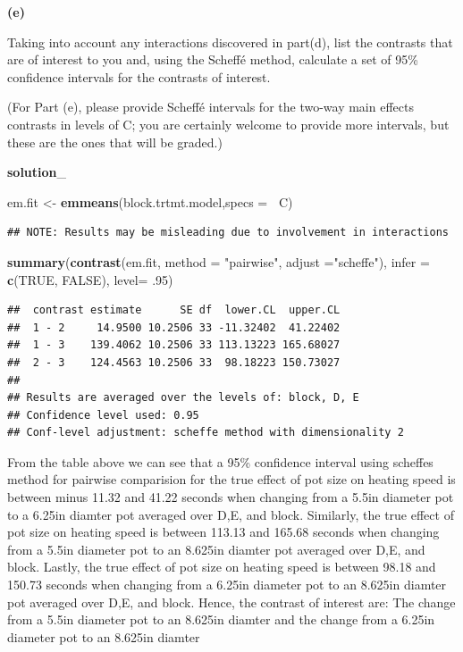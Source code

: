 \documentclass[12pt,]{article}
\newenvironment{Shaded}{\begin{snugshade}}{\end{snugshade}}
\newcommand{\KeywordTok}[1]{\textcolor[rgb]{0.13,0.29,0.53}{\textbf{#1}}}
\newcommand{\DataTypeTok}[1]{\textcolor[rgb]{0.13,0.29,0.53}{#1}}
\newcommand{\DecValTok}[1]{\textcolor[rgb]{0.00,0.00,0.81}{#1}}
\newcommand{\StringTok}[1]{\textcolor[rgb]{0.31,0.60,0.02}{#1}}
\newcommand{\OtherTok}[1]{\textcolor[rgb]{0.56,0.35,0.01}{#1}}
\newcommand{\OperatorTok}[1]{\textcolor[rgb]{0.81,0.36,0.00}{\textbf{#1}}}
\newcommand{\NormalTok}[1]{#1}
\begin{document}
\textbf{(e)}

Taking into account any interactions discovered in part(d), list the
contrasts that are of interest to you and, using the Scheffé method,
calculate a set of 95\% confidence intervals for the contrasts of
interest.

(For Part (e), please provide Scheffé intervals for the two-way main
effects contrasts in levels of C; you are certainly welcome to provide
more intervals, but these are the ones that will be graded.)

\textbf{solution}\_

\begin{Shaded}
\begin{Highlighting}[]
\NormalTok{em.fit <-}\StringTok{ }\KeywordTok{emmeans}\NormalTok{(block.trtmt.model,}\DataTypeTok{specs =}\OperatorTok{~}\StringTok{ }\NormalTok{C)}
\end{Highlighting}
\end{Shaded}

\begin{verbatim}
## NOTE: Results may be misleading due to involvement in interactions
\end{verbatim}

\begin{Shaded}
\begin{Highlighting}[]
\KeywordTok{summary}\NormalTok{(}\KeywordTok{contrast}\NormalTok{(em.fit, }\DataTypeTok{method =} \StringTok{"pairwise"}\NormalTok{, }\DataTypeTok{adjust =}\StringTok{"scheffe"}\NormalTok{), }\DataTypeTok{infer =} \KeywordTok{c}\NormalTok{(}\OtherTok{TRUE}\NormalTok{, }\OtherTok{FALSE}\NormalTok{), }\DataTypeTok{level=}\NormalTok{ .}\DecValTok{95}\NormalTok{)}
\end{Highlighting}
\end{Shaded}

\begin{verbatim}
##  contrast estimate      SE df  lower.CL  upper.CL
##  1 - 2     14.9500 10.2506 33 -11.32402  41.22402
##  1 - 3    139.4062 10.2506 33 113.13223 165.68027
##  2 - 3    124.4563 10.2506 33  98.18223 150.73027
## 
## Results are averaged over the levels of: block, D, E 
## Confidence level used: 0.95 
## Conf-level adjustment: scheffe method with dimensionality 2
\end{verbatim}

From the table above we can see that a 95\% confidence interval using
scheffes method for pairwise comparision for the true effect of pot size
on heating speed is between minus 11.32 and 41.22 seconds when changing
from a 5.5in diameter pot to a 6.25in diamter pot averaged over D,E, and
block. Similarly, the true effect of pot size on heating speed is
between 113.13 and 165.68 seconds when changing from a 5.5in diameter
pot to an 8.625in diamter pot averaged over D,E, and block. Lastly, the
true effect of pot size on heating speed is between 98.18 and 150.73
seconds when changing from a 6.25in diameter pot to an 8.625in diamter
pot averaged over D,E, and block. Hence, the contrast of interest are:
The change from a 5.5in diameter pot to an 8.625in diamter and the
change from a 6.25in diameter pot to an 8.625in diamter
\end{document}
